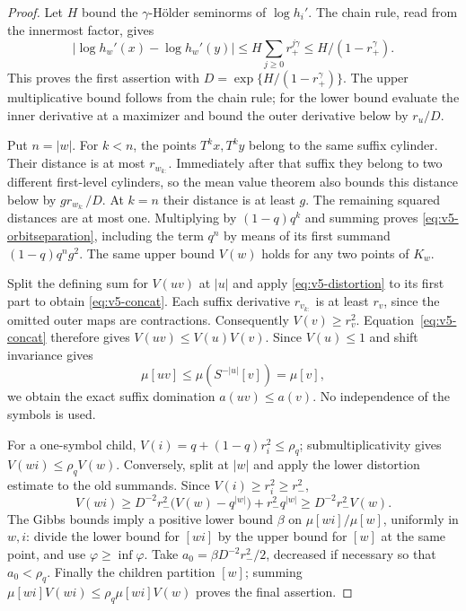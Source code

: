 \begin{proof}
Let $H$ bound the $\gamma$-H\"older seminorms of $\log h_i'$. The
chain rule, read from the innermost factor, gives
\[
 |\log h_w'(x)-\log h_w'(y)|
 \le H\sum_{j\ge0}r_+^{j\gamma}\le H/(1-r_+^\gamma).
\]
This proves the first assertion with $D=\exp\{H/(1-r_+^\gamma)\}$.
The upper multiplicative bound follows from the chain rule; for the
lower bound evaluate the inner derivative at a maximizer and bound
the outer derivative below by $r_u/D$.

Put $n=|w|$. For $k<n$, the points $T^kx,T^ky$ belong to the same
suffix cylinder. Their distance is at most $r_{w_{k:}}$. Immediately
after that suffix they belong to two different first-level cylinders,
so the mean value theorem also bounds this distance below by
$g r_{w_{k:}}/D$. At $k=n$ their distance is at least $g$. The
remaining squared distances are at most one. Multiplying by
$(1-q)q^k$ and summing proves \eqref{eq:v5-orbitseparation}, including
the term $q^n$ by means of its first summand $(1-q)q^ng^2$.
The same upper bound $V(w)$ holds for any two points of $K_w$.

Split the defining sum for $V(uv)$ at $|u|$ and apply
\eqref{eq:v5-distortion} to its first part to obtain
\eqref{eq:v5-concat}. Each suffix derivative $r_{v_{k:}}$ is
at least $r_v$, since the omitted outer maps are contractions.
Consequently $V(v)\ge r_v^2$. Equation~\eqref{eq:v5-concat}
therefore gives $V(uv)\le V(u)V(v)$. Since $V(u)\le1$ and
shift invariance gives
\[
 \mu[uv]\le\mu(S^{-|u|}[v])=\mu[v],
\]
we obtain the exact suffix domination $a(uv)\le a(v)$. No
independence of the symbols is used.

For a one-symbol child, $V(i)=q+(1-q)r_i^2\le\rho_q$;
submultiplicativity gives $V(wi)\le\rho_q V(w)$. Conversely,
split at $|w|$ and apply the lower distortion estimate to the
old summands. Since $V(i)\ge r_i^2\ge r_-^2$,
\[
 V(wi)\ge D^{-2}r_-^2\bigl(V(w)-q^{|w|}\bigr)
                  +r_-^2q^{|w|}
       \ge D^{-2}r_-^2V(w).
\]
The Gibbs bounds imply a positive lower bound $\beta$ on
$\mu[wi]/\mu[w]$, uniformly in $w,i$: divide the lower
bound for $[wi]$ by the upper bound for $[w]$ at the same
point, and use $\varphi\ge\inf\varphi$. Take
$a_0=\beta D^{-2}r_-^2/2$, decreased if necessary so that
$a_0<\rho_q$. Finally the children partition $[w]$; summing
$\mu[wi]V(wi)\le\rho_q\mu[wi]V(w)$ proves the final assertion.
\end{proof}

